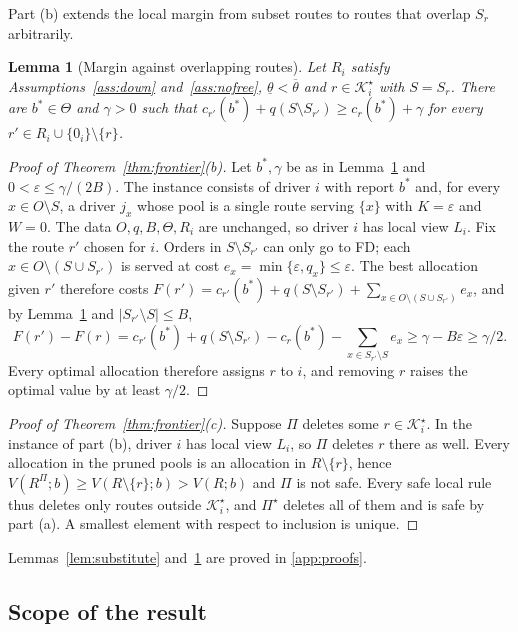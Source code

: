 \documentclass[review,12pt]{elsarticle}
\newtheorem{lemma}[theorem]{Lemma}
\theoremstyle{definition}
\theoremstyle{remark}
\newcommand{\Kstar}{\mathcal{K}^\star}
\newcommand{\lth}{\underline{\theta}}
\newcommand{\uth}{\overline{\theta}}
\begin{document}
Part (b) extends the local margin from subset routes to routes that overlap
$S_r$ arbitrarily.

\begin{lemma}[Margin against overlapping routes]
\label{lem:margin}
Let $R_i$ satisfy Assumptions~\ref{ass:down} and~\ref{ass:nofree},
$\lth<\uth$ and $r\in\Kstar_i$ with $S=S_r$. There are $b^\ast\in\Theta$ and
$\gamma>0$ such that
$c_{r'}(b^\ast)+q(S\setminus S_{r'})\ge c_r(b^\ast)+\gamma$ for every
$r'\in R_i\cup\{0_i\}\setminus\{r\}$.
\end{lemma}

\begin{proof}[Proof of Theorem~\ref{thm:frontier}(b)]
Let $b^\ast,\gamma$ be as in Lemma~\ref{lem:margin} and
$0<\varepsilon\le\gamma/(2B)$. The instance consists of driver $i$ with
report $b^\ast$ and, for every $x\in O\setminus S$, a driver $j_x$ whose pool
is a single route serving $\{x\}$ with $K=\varepsilon$ and $W=0$. The data
$O,q,B,\Theta,R_i$ are unchanged, so driver $i$ has local view $L_i$. Fix
the route $r'$ chosen for $i$. Orders in $S\setminus S_{r'}$ can only go to
FD; each $x\in O\setminus(S\cup S_{r'})$ is served at cost
$e_x=\min\{\varepsilon,q_x\}\le\varepsilon$. The best allocation given $r'$
therefore costs
$F(r')=c_{r'}(b^\ast)+q(S\setminus S_{r'})+\sum_{x\in O\setminus(S\cup S_{r'})}e_x$,
and by Lemma~\ref{lem:margin} and $|S_{r'}\setminus S|\le B$,
\[
F(r')-F(r)=c_{r'}(b^\ast)+q(S\setminus S_{r'})-c_r(b^\ast)-\sum_{x\in S_{r'}\setminus S}e_x\ge\gamma-B\varepsilon\ge\gamma/2 .
\]
Every optimal allocation therefore assigns $r$ to $i$, and removing $r$
raises the optimal value by at least $\gamma/2$.
\end{proof}

\begin{proof}[Proof of Theorem~\ref{thm:frontier}(c)]
Suppose $\Pi$ deletes some $r\in\Kstar_i$. In the instance of part (b),
driver $i$ has local view $L_i$, so $\Pi$ deletes $r$ there as well. Every
allocation in the pruned pools is an allocation in $R\setminus\{r\}$, hence
$V(R^\Pi;b)\ge V(R\setminus\{r\};b)>V(R;b)$ and $\Pi$ is not safe. Every
safe local rule thus deletes only routes outside $\Kstar_i$, and $\Pi^\star$
deletes all of them and is safe by part (a). A smallest element with respect
to inclusion is unique.
\end{proof}

Lemmas~\ref{lem:substitute} and~\ref{lem:margin} are proved in
\ref{app:proofs}.

\subsection{Scope of the result}
\end{document}
